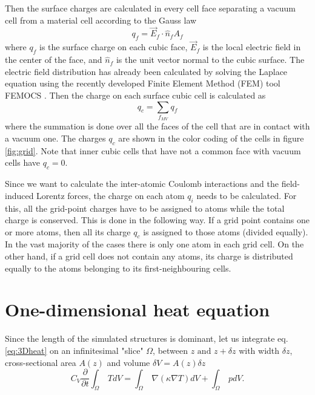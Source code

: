 \documentclass[%
 aps,
 prb,%
 amsmath,amssymb,
reprint,%
superscriptaddress,
]{revtex4-1}
\begin{document}
Then the surface charges are calculated in every cell face separating a vacuum cell from a material cell according to the Gauss law 
\begin{equation}
	\label{eq:Gauss}
	q_f = \vec{E}_f \cdot \hat{n}_f A_f
\end{equation}
where $q_f$ is the surface charge on each cubic face, $\vec{E}_f$ is the local electric field in the center of the face, and $\hat{n}_f$ is the unit vector normal to the cubic surface.
The electric field distribution has already been calculated by solving the Laplace equation using the recently developed Finite Element Method (FEM) tool FEMOCS \cite{VekseDynamic_arxiv}.
Then the charge on each surface cubic cell is calculated as
\begin{equation}
	\label{eq:Qatom}
	q_c = \sum_{f_{MV}} q_f
\end{equation}
where the summation is done over all the faces of the cell that are in contact with a vacuum one.
The charges $q_c$ are shown in the color coding of the cells in figure \ref{fig:grid}. Note that inner cubic cells that have not a common face with vacuum cells have $q_c=0$.

Since we want to calculate the inter-atomic Coulomb interactions and the field-induced Lorentz forces, the charge on each atom $q_i$ needs to be calculated.
For this, all the grid-point charges have to be assigned to atoms while the total charge is conserved.
This is done in the following way. If a grid point contains one or more atoms, then all its charge $q_c$ is assigned to those atoms (divided equally).
In the vast majority of the cases there is only one atom in each grid cell.
On the other hand, if a grid cell does not contain any atoms, its charge is distributed equally to the atoms belonging to its first-neighbouring cells. 

\section{One-dimensional heat equation} \label{sec:1dheat}

Since the length of the simulated structures is dominant, let us integrate eq. \eqref{eq:3Dheat} on an infinitesimal "slice" $\Omega$, between $z \textrm{ and } z + \delta z$ with width $\delta z$, cross-sectional area $A(z)$ and volume $\delta V = A(z) \delta z$
\begin{equation}
	\label{eq:IntegHeat}
	C_V \frac{\partial }{\partial t} \int_{\Omega}~TdV = \int_{\Omega}~\nabla \left(\kappa \nabla T \right) dV + \int_{\Omega}~pdV \textrm{.}
\end{equation} 
\end{document}
